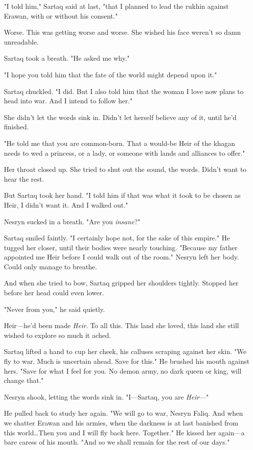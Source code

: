 "I told him," Sartaq said at last, "that I planned to lead the rukhin against Erawan, with or without his consent."

Worse.
This was getting worse and worse.
She wished his face weren't so damn unreadable.

Sartaq took a breath.
"He asked me why."

"I hope you told him that the fate of the world might depend upon it."

Sartaq chuckled.
"I did.
But I also told him that the woman I love now plans to head into war.
And I intend to follow her."

She didn't let the words sink in.
Didn't let herself believe any of it, until he'd finished.

"He told me that you are common-born.
That a would-be Heir of the khagan needs to wed a princess, or a lady, or someone with lands and alliances to offer."

Her throat closed up.
She tried to shut out the sound, the words.
Didn't want to hear the rest.

But Sartaq took her hand.
"I told him if that was what it took to be chosen as Heir, I didn't want it.
And I walked out."

Nesryn sucked in a breath.
"Are you \emph{insane}?"

Sartaq smiled faintly.
"I certainly hope not, for the sake of this empire."
He tugged her closer, until their bodies were nearly touching.
"Because my father appointed me Heir before I could walk out of the room."
Nesryn left her body.
Could only manage to breathe.

And when she tried to bow, Sartaq gripped her shoulders tightly.
Stopped her before her head could even lower.

"Never from you," he said quietly.

Heir---he'd been made \emph{Heir}.
To all this.
This land she loved, this land she still wished to explore so much it ached.

Sartaq lifted a hand to cup her cheek, his calluses scraping against her skin.
"We fly to war.
Much is uncertain ahead.
Save for this."
He brushed his mouth against hers.
"Save for what I feel for you.
No demon army, no dark queen or king, will change that."

Nesryn shook, letting the words sink in.
"I---Sartaq, you are \emph{Heir}---"

He pulled back to study her again.
"We will go to war, Nesryn Faliq.
And when we shatter Erawan and his armies, when the darkness is at last banished from this world\ldots Then you and I will fly back here.
Together."
He kissed her again---a bare caress of his mouth.
"And so we shall remain for the rest of our days."

